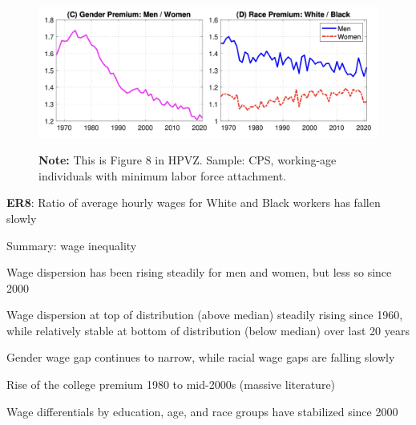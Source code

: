 \documentclass[11pt, aspectratio=169]{beamer}
\newenvironment{witemize}{\itemize\addtolength{\itemsep}{10pt}}{\enditemize}
\begin{document}
\begin{frame}{}
	\begin{figure}
		\includegraphics[scale=0.4]{./figures/inequality_wage_5}
	\vspace*{-2mm}
	\begin{flushleft}
		{\scriptsize \hspace{6mm} \textbf{Note:} This is Figure 8 in HPVZ. Sample: CPS, working-age individuals with minimum labor force attachment.}
	\end{flushleft}	
	\end{figure}

	\vspace{2mm}
	{\color{blue}\textbf{ER8}}: Ratio of average hourly wages for White and Black workers has fallen slowly  
\end{frame}


\begin{frame}{Summary: wage inequality}

\begin{witemize}
\item Wage dispersion has been rising steadily for men and women, but less so since 2000

\item Wage dispersion at top of distribution (above median) steadily rising since 1960, while relatively stable at bottom of distribution (below median) over last 20 years

\item Gender wage gap continues to narrow, while racial wage gaps are falling slowly

\item Rise of the college premium 1980 to mid-2000s (massive literature)

\item Wage differentials by education, age, and race groups have stabilized since 2000

\end{witemize}
\end{frame}
\end{document}
